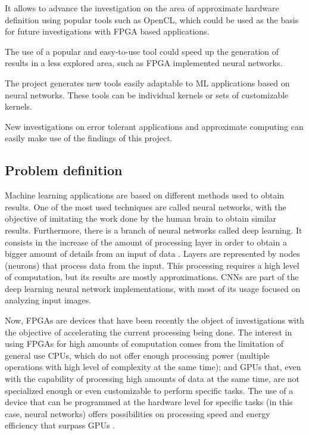 \begin{compactitem}
    \item It allows to advance the investigation on the area of approximate hardware definition
    using popular tools such as OpenCL, which could be used as the basis for future investigations
    with FPGA based applications.
    \item The use of a popular and easy-to-use tool could speed up the generation of results in a
    less explored area, such as FPGA implemented neural networks.
    \item The project generates new tools easily adaptable to ML applications based
    on neural networks. These tools can be individual kernels or sets of customizable kernels. 
    \item New investigations on error tolerant applications and approximate computing can easily 
    make use of the findings of this project.
\end{compactitem}


\subsection{Problem definition}

Machine learning applications are based on different methods used to obtain results.
One of the most used techniques are called neural networks, with the objective of imitating the work
done by the human brain to obtain similar results. Furthermore, there is a branch of neural networks
called deep learning. It consists in the increase of the amount of processing layer in order to obtain
a bigger amount of details from an input of data \cite{deeplearningoverview}. Layers are represented by nodes (neurons)
that process data from the input. This processing requires a high level of computation, but its
results are mostly approximations. CNNs are part of the deep learning neural network implementations, with most
of its usage focused on analyzing input images.

Now, FPGAs are devices that have been recently the object of investigations with the objective of accelerating
the current processing being done. The interest in using FPGAs for high amounts of computation comes from
the limitation of general use CPUs, which do not offer enough processing power (multiple operations with 
high level of complexity at the same time); and GPUs that, even with the capability of processing high
amounts of data at the same time, are not specialized enough or even customizable to perform specific tasks.
The use of a device that can be programmed at the hardware level for specific tasks (in this case, neural networks)
offers possibilities on processing speed and energy efficiency that surpass GPUs \cite{surveyfpgann}.

